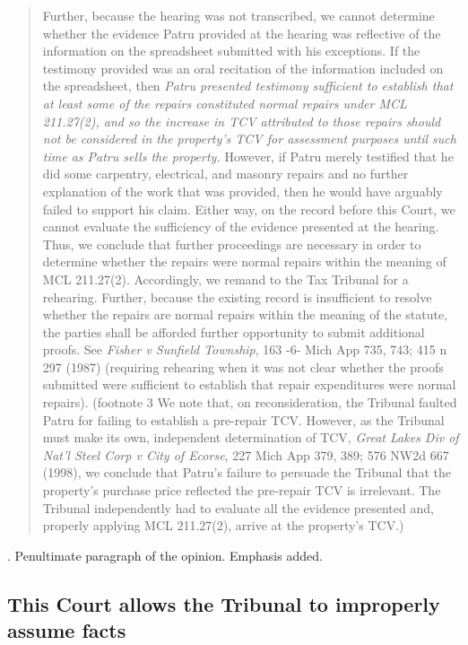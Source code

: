 \documentclass[12pt,\documentclassflag]{michiganCourtOfAppealsBrief}
\begin{document}
\begin{quotation}
  Further, because the hearing was not transcribed, we cannot determine whether the
evidence Patru provided at the hearing was reflective of the information on the spreadsheet
submitted with his exceptions. If the testimony provided was an oral recitation of the
information included on the spreadsheet, then \emph{Patru presented testimony sufficient to establish
that at least some of the repairs constituted normal repairs under MCL 211.27(2), and so the
increase in TCV attributed to those repairs should not be considered in the property's TCV for
assessment purposes until such time as Patru sells the property.} However, if Patru merely
testified that he did some carpentry, electrical, and masonry repairs and no further explanation of
the work that was provided, then he would have arguably failed to support his claim. Either way,
on the record before this Court, we cannot evaluate the sufficiency of the evidence presented at
the hearing. Thus, we conclude that further proceedings are necessary in order to determine
whether the repairs were normal repairs within the meaning of MCL 211.27(2). Accordingly, we
remand to the Tax Tribunal for a rehearing. Further, because the existing record is insufficient to
resolve whether the repairs are normal repairs within the meaning of the statute, the parties shall
be afforded further opportunity to submit additional proofs. See \emph{Fisher v Sunfield Township}, 163
-6-
Mich App 735, 743; 415 n 297 (1987) (requiring rehearing when it was not clear whether the
proofs submitted were sufficient to establish that repair expenditures were normal repairs).
(footnote 3 We note that, on reconsideration, the Tribunal faulted Patru for failing to establish a pre-repair
TCV. However, as the Tribunal must make its own, independent determination of TCV, \emph{Great
Lakes Div of Nat'l Steel Corp v City of Ecorse}, 227 Mich App 379, 389; 576 NW2d 667 (1998),
we conclude that Patru's failure to persuade the Tribunal that the property's purchase price
reflected the pre-repair TCV is irrelevant. The Tribunal independently had to evaluate all the
evidence presented and, properly applying MCL 211.27(2), arrive at the property's TCV.)
\end{quotation}

. Penultimate paragraph of the opinion. Emphasis added.

\subsection{This Court allows the Tribunal to improperly assume facts}
\end{document}
